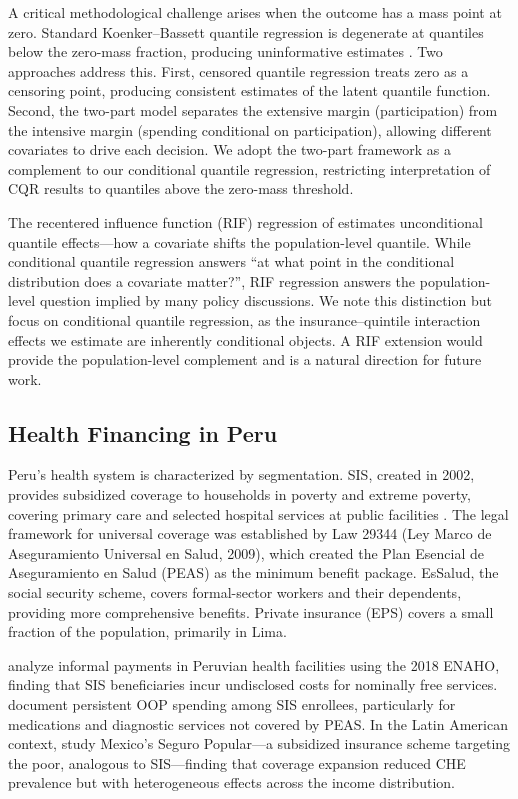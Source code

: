 A critical methodological challenge arises when the outcome has a mass point at zero. Standard Koenker--Bassett quantile regression is degenerate at quantiles below the zero-mass fraction, producing uninformative estimates \citep{MachadoSilva2005}. Two approaches address this. First, censored quantile regression \citep{Powell1986, Chernozhukov2002} treats zero as a censoring point, producing consistent estimates of the latent quantile function. Second, the two-part model \citep{Manning1987, Mullahy1998} separates the extensive margin (participation) from the intensive margin (spending conditional on participation), allowing different covariates to drive each decision. We adopt the two-part framework as a complement to our conditional quantile regression, restricting interpretation of CQR results to quantiles above the zero-mass threshold.

The recentered influence function (RIF) regression of \citet{Firpo2009} estimates unconditional quantile effects---how a covariate shifts the population-level quantile. While conditional quantile regression answers ``at what point in the conditional distribution does a covariate matter?'', RIF regression answers the population-level question implied by many policy discussions. We note this distinction but focus on conditional quantile regression, as the insurance--quintile interaction effects we estimate are inherently conditional objects. A RIF extension would provide the population-level complement and is a natural direction for future work.

\subsection{Health Financing in Peru}

Peru's health system is characterized by segmentation. SIS, created in 2002, provides subsidized coverage to households in poverty and extreme poverty, covering primary care and selected hospital services at public facilities \citep{Petrera2013}. The legal framework for universal coverage was established by Law 29344 (Ley Marco de Aseguramiento Universal en Salud, 2009), which created the Plan Esencial de Aseguramiento en Salud (PEAS) as the minimum benefit package. EsSalud, the social security scheme, covers formal-sector workers and their dependents, providing more comprehensive benefits. Private insurance (EPS) covers a small fraction of the population, primarily in Lima.

\citet{EspinozaPajuelo2024} analyze informal payments in Peruvian health facilities using the 2018 ENAHO, finding that SIS beneficiaries incur undisclosed costs for nominally free services. \citet{Petrera2013} document persistent OOP spending among SIS enrollees, particularly for medications and diagnostic services not covered by PEAS. In the Latin American context, \citet{Knaul2006} study Mexico's Seguro Popular---a subsidized insurance scheme targeting the poor, analogous to SIS---finding that coverage expansion reduced CHE prevalence but with heterogeneous effects across the income distribution.

